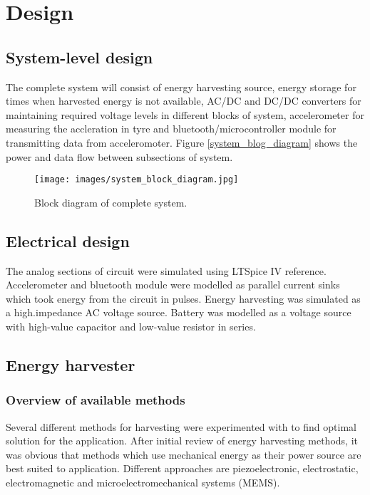 \section{Design}

\subsection{System-level design}
The complete system will consist of energy harvesting source, energy storage for times when harvested energy is not available, AC/DC and DC/DC converters for maintaining required voltage levels in different blocks of system, accelerometer for measuring the accleration in tyre and bluetooth/microcontroller module for transmitting data from acceleromoter. Figure \ref{system_blog_diagram} shows the power and data flow between subsections of system. 


\begin{figure}[htb]
\begin{center}
\texttt{[image: images/system\_block\_diagram.jpg]}
\end{center}
\caption{\label{system_blog_diagram} Block diagram of complete system.}
\label{liitekuva}
\end{figure}


\subsection{Electrical design}
The analog sections of circuit were simulated using LTSpice IV {\color{red} reference}. Accelerometer and bluetooth module were modelled as parallel current sinks which took energy from the circuit in pulses. Energy harvesting was simulated as a high.impedance AC voltage source. 
Battery was modelled as a voltage source with high-value capacitor and low-value resistor in series.

\subsection{Energy harvester}
\subsubsection{Overview of available methods}
Several different methods for harvesting were experimented with to find optimal solution for the application. After initial review of energy harvesting methods, it was obvious that methods which use mechanical energy as their power source are best suited to application. Different approaches are piezoelectronic, electrostatic, electromagnetic and microelectromechanical systems (MEMS). 

